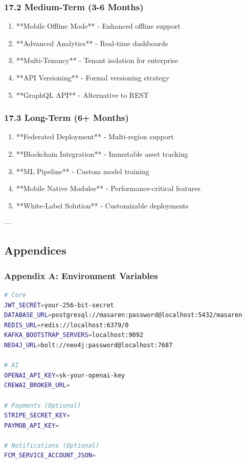 \documentclass[11pt,a4paper]{article}
\begin{document}
\subsubsection{17.2 Medium-Term (3-6 Months)}

\begin{enumerate}
\item **Mobile Offline Mode** - Enhanced offline support
\item **Advanced Analytics** - Real-time dashboards
\item **Multi-Tenancy** - Tenant isolation for enterprise
\item **API Versioning** - Formal versioning strategy
\item **GraphQL API** - Alternative to REST
\end{enumerate}

\subsubsection{17.3 Long-Term (6+ Months)}

\begin{enumerate}
\item **Federated Deployment** - Multi-region support
\item **Blockchain Integration** - Immutable asset tracking
\item **ML Pipeline** - Custom model training
\item **Mobile Native Modules** - Performance-critical features
\item **White-Label Solution** - Customizable deployments
\end{enumerate}

---

\subsection{Appendices}

\subsubsection{Appendix A: Environment Variables}


\begin{lstlisting}[language=bash, caption=bash code]
# Core
JWT_SECRET=your-256-bit-secret
DATABASE_URL=postgresql://masaren:password@localhost:5432/masaren
REDIS_URL=redis://localhost:6379/0
KAFKA_BOOTSTRAP_SERVERS=localhost:9092
NEO4J_URL=bolt://neo4j:password@localhost:7687

# AI
OPENAI_API_KEY=sk-your-openai-key
CREWAI_BROKER_URL=

# Payments (Optional)
STRIPE_SECRET_KEY=
PAYMOB_API_KEY=

# Notifications (Optional)
FCM_SERVICE_ACCOUNT_JSON=
\end{lstlisting}
\end{document}
